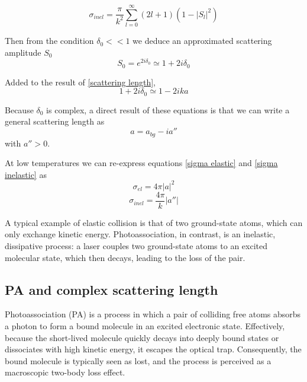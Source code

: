 \begin{equation}
    \sigma_{inel} = \frac{\pi}{k^2}\sum_{l=0}^{\infty}(2l+1)(1-|S_l|^2)
    \label{sigma inelastic}
\end{equation}


Then from the condition $\delta_0 << 1$ we deduce an approximated scattering amplitude $S_0$
\begin{equation}
    S_0 = e^{2i\delta_0} \simeq 1 + 2i\delta_0
\end{equation}

Added to the result of \ref{scattering length},
\begin{equation}
     1 + 2i\delta_0 \simeq 1 - 2ika
\end{equation}

Because $\delta_0$ is complex, a direct result of these equations is that we can write a general scattering length as
\begin{equation}
    a = a_{bg} - i a''
\end{equation}
with $a''>0$.

At low temperatures we can re-express equations \ref{sigma elastic} and \ref{sigma inelastic} as
\begin{equation}
    \sigma_{el} = 4\pi|a|^2
\end{equation}
\begin{equation}
    \sigma_{inel} = \frac{4\pi}{k}|a''|
    \label{sigma propto a}
\end{equation}

A typical example of elastic collision is that of two ground-state atoms, which can only
exchange kinetic energy. Photoassociation, in contrast, is an inelastic, dissipative
process: a laser couples two ground-state atoms to an excited molecular state, which then
decays, leading to the loss of the pair.


\subsection{PA and complex scattering length}
Photoassociation (PA) is a process in which a pair of colliding free atoms absorbs a photon to form a bound molecule in an excited electronic state. Effectively, because the short-lived molecule quickly decays into 
deeply bound states or dissociates with high kinetic energy, it escapes the optical trap. Consequently, the bound molecule is typically seen as lost, and the process is perceived as a macroscopic two-body loss effect.


